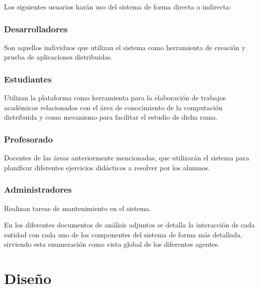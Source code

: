 Los siguientes usuarios harán uso del sistema de forma directa o indirecta:

\subsection{Desarrolladores}

Son aquellos individuos que utilizan el sistema como herramienta de creación y prueba de aplicaciones distribuidas.

\subsection{Estudiantes}

Utilizan la plataforma como herramienta para la elaboración de trabajos académicos relacionados con el área de conocimiento de la computación distribuida y como mecanismo para facilitar el estudio de dicha rama.

\subsection{Profesorado}

Docentes de las áreas anteriormente mencionadas, que utilizarán el sistema para planificar diferentes ejercicios didácticos a resolver por los alumnos.

\subsection{Administradores}

Realizan tareas de mantenimiento en el sistema.

\vspace{1.5cm}

En los diferentes documentos de análisis adjuntos se detalla la interacción de cada entidad con cada uno de los componentes del sistema de forma más detallada, sirviendo esta enumeración como vista global de los diferentes agentes.

\chapter{Diseño}

